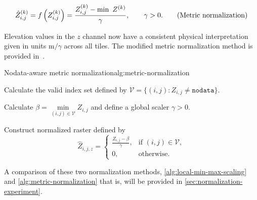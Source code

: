 \begin{equation*}
  \hat{Z}_{i,j}^{(k)}
  =
  f\left(Z_{i,j}^{(k)}\right)
  =
  \frac{%
    Z_{i,j}^{(k)} - \min~Z^{(k)}
  }{%
    \gamma
  },%
  \hspace{2em} \gamma > 0.
  \tag{Metric normalization} %
  \label{test}
\end{equation*}

Elevation values in the $z$ channel now have a consistent physical interpretation given in units $\si{\meter} / \gamma$ across all tiles.
The modified metric normalization method is provided in~.

\begin{algorithm}{Nodata-aware metric normalization}{alg:metric-normalization}
  \item Calculate the valid index set defined by $\mathcal{V} = \{(i, j): Z_{i,j} \neq \texttt{nodata}\}$.
  \item Calculate $\beta = \underset{(i,j) \in \mathcal{V}}{\min} Z_{i,j}$ and define a global scaler $\gamma > 0$.
  \item Construct normalized raster defined by
    \begin{equation*}
        \hat{Z}_{i,j,z} = \begin{cases}
          \frac{Z_{i,j} - \beta}{\gamma}, & \text{if } (i,j) \in \mathcal{V}, \\
          0, & \text{otherwise.}
        \end{cases}
    \end{equation*}
\end{algorithm}

A comparison of these two normalization methods, \cref{alg:local-min-max-scaling} and \cref{alg:metric-normalization} that is, will be provided in \cref{sec:normalization-experiment}.

